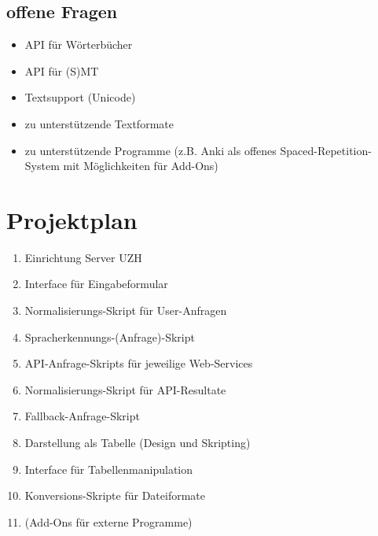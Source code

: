 \documentclass[a4paper]{article}
\begin{document}
\subsection{offene Fragen}

\begin{itemize}
	\item API für Wörterbücher
	\item API für (S)MT
	\item Textsupport (Unicode)
	\item zu unterstützende Textformate
	\item zu unterstützende Programme (z.B. Anki als offenes Spaced-Repetition-System mit Möglichkeiten für Add-Ons)
\end{itemize}

\section{Projektplan}

\begin{enumerate}
	\item Einrichtung Server UZH
	\item Interface für Eingabeformular
	\item Normalisierungs-Skript für User-Anfragen
	\item Spracherkennungs-(Anfrage)-Skript
	\item API-Anfrage-Skripts für jeweilige Web-Services
	\item Normalisierungs-Skript für API-Resultate
	\item Fallback-Anfrage-Skript
	\item Darstellung als Tabelle (Design und Skripting)
	\item Interface für Tabellenmanipulation
	\item Konversions-Skripte für Dateiformate
	\item (Add-Ons für externe Programme)
\end{enumerate}
\end{document}
